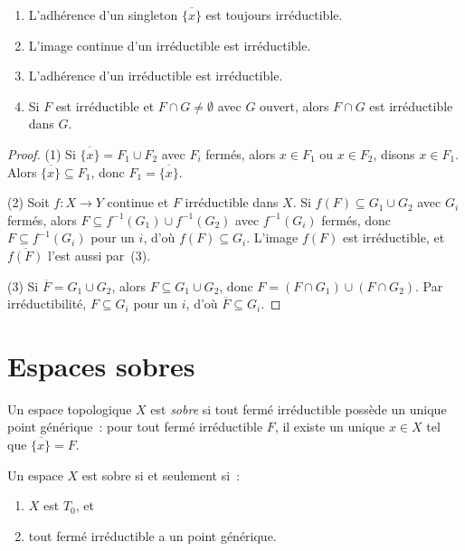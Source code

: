 \begin{proposition}
\begin{enumerate}
  \item L'adh\'erence d'un singleton $\overline{\{x\}}$ est toujours irr\'eductible.
  \item L'image continue d'un irr\'eductible est irr\'eductible.
  \item L'adh\'erence d'un irr\'eductible est irr\'eductible.
  \item Si $F$ est irr\'eductible et $F \cap G \neq \emptyset$ avec $G$ ouvert, alors
    $F \cap G$ est irr\'eductible dans $G$.
\end{enumerate}
\end{proposition}

\begin{proof}
(1) Si $\overline{\{x\}} = F_1 \cup F_2$ avec $F_i$ ferm\'es, alors $x \in F_1$ ou
$x \in F_2$, disons $x \in F_1$. Alors $\overline{\{x\}} \subseteq F_1$, donc
$F_1 = \overline{\{x\}}$.

(2) Soit $f\colon X \to Y$ continue et $F$ irr\'eductible dans $X$. Si
$f(F) \subseteq G_1 \cup G_2$ avec $G_i$ ferm\'es, alors $F \subseteq f^{-1}(G_1) \cup
f^{-1}(G_2)$ avec $f^{-1}(G_i)$ ferm\'es, donc $F \subseteq f^{-1}(G_i)$ pour un $i$,
d'o\`u $f(F) \subseteq G_i$. L'image $f(F)$ est irr\'eductible, et $\overline{f(F)}$
l'est aussi par~(3).

(3) Si $\overline{F} = G_1 \cup G_2$, alors $F \subseteq G_1 \cup G_2$, donc
$F = (F \cap G_1) \cup (F \cap G_2)$. Par irr\'eductibilit\'e, $F \subseteq G_i$ pour
un $i$, d'o\`u $\overline{F} \subseteq G_i$.
\end{proof}

\section{Espaces sobres}

\begin{definition}
Un espace topologique $X$ est \emph{sobre} si tout ferm\'e irr\'eductible poss\`ede un
unique point g\'en\'erique~: pour tout ferm\'e irr\'eductible $F$, il existe un unique
$x \in X$ tel que $\overline{\{x\}} = F$.
\end{definition}

\begin{theoreme}
Un espace $X$ est sobre si et seulement si~:
\begin{enumerate}
  \item $X$ est $T_0$, et
  \item tout ferm\'e irr\'eductible a un point g\'en\'erique.
\end{enumerate}
\end{theoreme}

